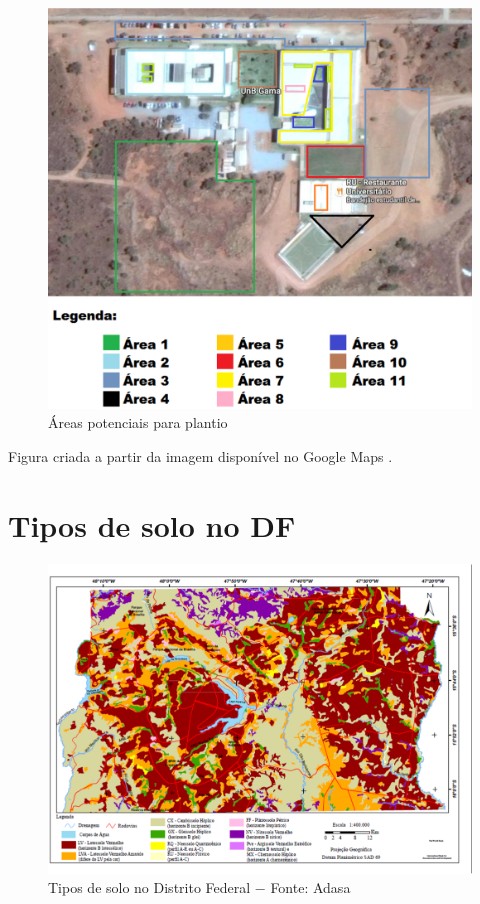 \begin{anexosenv}
  \label{areas-potenciais}
  \begin{figure}[!htb]
    \centering
    \includegraphics[width=12cm, keepaspectratio=true]{figuras/infraestrutura/fga.eps}
    \caption{Áreas potenciais para plantio}
  \end{figure}

  Figura criada a partir da imagem disponível no Google Maps \cite{infra1}.

\chapter{Tipos de solo no DF}

  \label{tipos-solo}
  \begin{figure}[!htb]
    \centering
    \includegraphics[width=12cm, keepaspectratio=true]{figuras/infraestrutura/solo.eps}
    \caption{Tipos de solo no Distrito Federal $-$ Fonte: Adasa}
  \end{figure}

\end{anexosenv}
